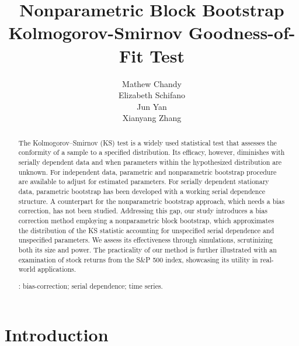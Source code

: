 \documentclass[12pt, titlepage, letterpaper]{article}
\begin{document}

\title{Nonparametric Block Bootstrap Kolmogorov-Smirnov Goodness-of-Fit Test}
  \author{Mathew Chandy \\
 Elizabeth Schifano\\
 Jun Yan\\
 Xianyang Zhang
} 


\maketitle


\begin{abstract}

The Kolmogorov--Smirnov (KS) test is a widely used statistical test that
assesses the conformity of a sample to a specified distribution. Its efficacy,
however, diminishes with serially dependent data and when parameters
within the hypothesized distribution are unknown. For independent data,
parametric and nonparametric bootstrap procedure are available to adjust for
estimated parameters. For serially dependent stationary data, parametric
bootstrap has been developed with a working serial dependence structure. A
counterpart for the nonparametric bootstrap approach, which needs a bias
correction, has not been studied. Addressing this gap, our study introduces a
bias correction method employing a nonparametric block bootstrap, which
approximates the distribution of the KS statistic accounting for unspecified
serial dependence and unspecified parameters. We assess its effectiveness
through simulations, scrutinizing both its size and power. The practicality of
our method is further illustrated with an examination of stock returns from the 
S\&P 500 index, showcasing its utility in real-world
applications.

\bigskip
{}:
bias-correction; 
serial dependence;
time series. 
\end{abstract}

\doublespace 


\section{Introduction}
\label{sec:intro}
\end{document}
